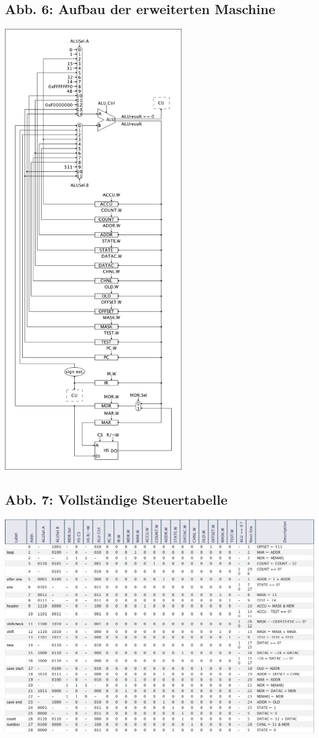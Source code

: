 \documentclass[12pt,titlepage]{article}
\begin{document}
\subsection{Abb. 6: Aufbau der erweiterten Maschine}
\includegraphics[height=19cm]{schematics_added.png}

\subsection{Abb. 7: Vollständige Steuertabelle}
\includegraphics[width=18cm]{signal_table.png}
\end{document}
